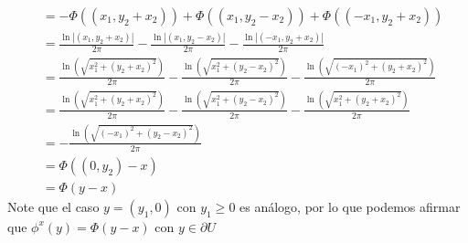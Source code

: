 \begin{homeworkProblem}
\begin{solucion}
\begin{align*}
      &=-\Phi((x_1,y_2+x_2))+\Phi((x_1,y_2-x_2))+\Phi((-x_1,y_2+x_2))\\
      &=\frac{\ln|(x_1,y_2+x_2)|}{2\pi}-\frac{\ln|(x_1,y_2-x_2)|}{2\pi}-\frac{\ln|(-x_1,y_2+x_2)|}{2\pi}\\
      &=\frac{\ln\left( \sqrt{x_1^2 + (y_2+x_2)^2} \right)}{2\pi}-\frac{\ln\left( \sqrt{x_1^2 + (y_2-x_2)^2} \right)}{2\pi}-\frac{\ln\left( \sqrt{(-x_1)^2 + (y_2+x_2)^2} \right)}{2\pi}\\
      &=\frac{\ln\left( \sqrt{x_1^2 + (y_2+x_2)^2} \right)}{2\pi}-\frac{\ln\left( \sqrt{x_1^2 + (y_2-x_2)^2} \right)}{2\pi}-\frac{\ln\left( \sqrt{x_1^2 + (y_2+x_2)^2} \right)}{2\pi}\\
      &=-\frac{\ln\left( \sqrt{(-x_1)^2 + (y_2-x_2)^2} \right)}{2\pi}\\
      &=\Phi((0,y_2)-x)\\
      &=\Phi(y-x)
    \end{align*}
    Note que el caso $y=(y_1,0)$ con $y_1\geq 0$ es análogo, por lo que podemos afirmar que $\phi^x(y)=\Phi(y-x)$ con $y\in\partial U$ 
  \end{solucion}
\end{homeworkProblem}
